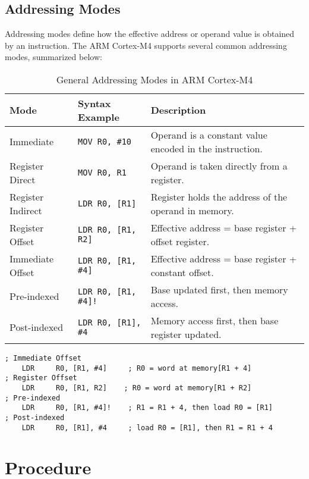 \subsection{Addressing Modes}

Addressing modes define how the effective address or operand value is obtained by an instruction. 
The ARM Cortex-M4 supports several common addressing modes, summarized below:

\begin{table}[H]
\centering
\caption{General Addressing Modes in ARM Cortex-M4}
\small
\begin{tabularx}{\linewidth}{@{}l l X@{}}
\toprule
\textbf{Mode} & \textbf{Syntax Example} & \textbf{Description} \\
\midrule
Immediate      & \texttt{MOV R0, \#10}          & Operand is a constant value encoded in the instruction. \\
Register Direct& \texttt{MOV R0, R1}            & Operand is taken directly from a register. \\
Register Indirect & \texttt{LDR R0, [R1]}       & Register holds the address of the operand in memory. \\
Register Offset & \texttt{LDR R0, [R1, R2]}     & Effective address = base register + offset register. \\
Immediate Offset & \texttt{LDR R0, [R1, \#4]}   & Effective address = base register + constant offset. \\
Pre-indexed    & \texttt{LDR R0, [R1, \#4]!}    & Base updated first, then memory access. \\
Post-indexed   & \texttt{LDR R0, [R1], \#4}     & Memory access first, then base register updated. \\
\bottomrule
\end{tabularx}
\vspace{2pt}
\end{table}
\newpage
\begin{lstlisting}[caption={Examples of Offset, Pre-indexed, and Post-indexed Addressing Modes}]
; Immediate Offset
    LDR     R0, [R1, #4]     ; R0 = word at memory[R1 + 4]
; Register Offset
    LDR     R0, [R1, R2]    ; R0 = word at memory[R1 + R2]
; Pre-indexed
    LDR     R0, [R1, #4]!    ; R1 = R1 + 4, then load R0 = [R1]
; Post-indexed
    LDR     R0, [R1], #4     ; load R0 = [R1], then R1 = R1 + 4
\end{lstlisting}

\newpage
\section{Procedure}

